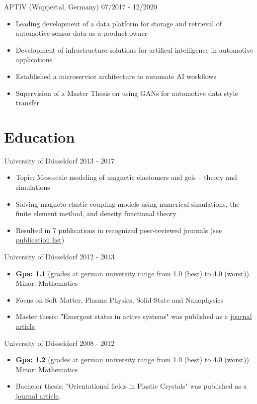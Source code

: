 \documentclass[singlesided,
               paper=a4,
               fontsize=10pt
              ]{my-resume}
\begin{document}
%
    {APTIV (Wuppertal, Germany)}
    {07/2017 - 12/2020}
    {\begin{itemize}[leftmargin=2em]
        \item Leading development of a data platform for storage and retrieval of automotive sensor data as a product owner
        \item Development of infrastructure solutions for artifical intelligence in automotive applications 
        \item Established a microservice architecture to automate AI workflows
        \item Supervision of a Master Thesis on using GANs for automotive data style transfer
    \end{itemize}}


\section[\faMortarBoard]{Education}
    {University of Düsseldorf}
    {2013 - 2017}
    {
        \begin{itemize}[leftmargin=2em]
            \item Topic: Mesoscale modeling of magnetic elastomers and gels -- theory and simulations
            \item Solving magneto-elastic coupling models using numerical simulations, the finite element method, and density functional theory
            \item Resulted in 7 publications in recognized peer-reviewed journals (see \href{https://scholar.google.com/citations?hl=de&user=MnU8ZxwAAAAJ}{publication list})
        \end{itemize}
    }
%
    {University of Düsseldorf}
    {2012 - 2013}
    {
        \begin{itemize}[leftmargin=2em]
            \item \textbf{Gpa: 1.1} (grades at german university range from 1.0 (best) to 4.0 (worst)). Minor: Mathematics
            \item Focus on Soft Matter, Plasma Physics, Solid-State and Nanophysics
            \item Master thesis: "Emergent states in active systems" was published as a \href{https://journals.aps.org/pre/abstract/10.1103/PhysRevE.89.022307}{journal article}
        \end{itemize}
    }
%
    {University of Düsseldorf}
    {2008 - 2012}
    {
        \begin{itemize}[leftmargin=2em]
            \item \textbf{Gpa: 1.2} (grades at german university range from 1.0 (best) to 4.0 (worst)). Minor: Mathematics
            \item Bachelor thesis: "Orientational fields in Plastic Crystals" was published as a \href{https://epljournal.edpsciences.org/articles/epl/abs/2012/15/epl14756/epl14756.html}{journal article}.
        \end{itemize}
    }
\end{document}
